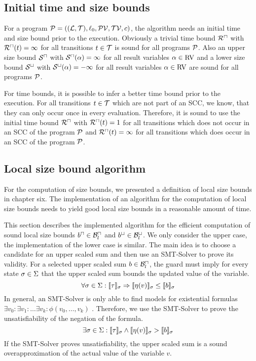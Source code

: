 \subsection{Initial time and size bounds}

For a program $\mathcal{P} = ((\mathcal{L}, \mathcal{T}), \ell_0, \mathcal{PV}, \mathcal{TV}, c)$, the algorithm needs an initial time and size bound prior to the execution.
Obviously a trivial time bound ${\mathcal{R}^\sqcap}$ with ${\mathcal{R}^\sqcap}(t) = \infty$ for all transitions $t \in \mathcal{T}$ is sound for all programs $\mathcal{P}$.
Also an upper size bound ${\mathcal{S}^\sqcap}$ with ${\mathcal{S}^\sqcap}(\alpha) = \infty$ for all result variables $\alpha \in \text{RV}$ and a lower size bound ${\mathcal{S}^\sqcup}$ with ${\mathcal{S}^\sqcup}(\alpha) = -\infty$ for all result variables $\alpha \in \text{RV}$ are sound for all programs $\mathcal{P}$.

For time bounds, it is possible to infer a better time bound prior to the execution.
For all transitions $t \in \mathcal{T}$ which are not part of an SCC, we know, that they can only occur once in every evaluation.
Therefore, it is sound to use the initial time bound ${\mathcal{R}^\sqcap}$ with ${\mathcal{R}^\sqcap}(t) = 1$ for all transitions which does not occur in an SCC of the program $\mathcal{P}$ and ${\mathcal{R}^\sqcap}(t) = \infty$ for all transitions which does occur in an SCC of the program $\mathcal{P}$.

\subsection{Local size bound algorithm}

For the computation of size bounds, we presented a definition of local size bounds in chapter six.
The implementation of an algorithm for the computation of local size bounds needs to yield good local size bounds in a reasonable amount of time.

This section describes the implemented algorithm for the efficient computation of sound local size bounds $b^\sqcap \in \mathcal{B}^\sqcap_l$ and $b^\sqcup \in \mathcal{B}^\sqcup_l$.
We only consider the upper case, the implementation of the lower case is similar.
The main idea is to choose a candidate for an upper scaled sum and then use an SMT-Solver to prove its validity.
For a selected upper scaled sum $b \in \mathcal{B}^\sqcap_l$, the guard must imply for every state $\sigma \in \Sigma$ that the upper scaled sum bounds the updated value of the variable.
\[ \forall \sigma \in \Sigma: \llbracket \tau \rrbracket_{\sigma} \Rightarrow \llbracket \eta(v) \rrbracket_{\sigma} \leq \llbracket b \rrbracket_{\sigma} \]
In general, an SMT-Solver is only able to find models for existential formulas $\exists v_0: \exists v_1: \dots \exists v_k: \phi(v_0, \dots, v_k)$ \cite{smt}.
Therefore, we use the SMT-Solver to prove the unsatisfiability of the negation of the formula.
\[ \exists \sigma \in \Sigma: \llbracket \tau \rrbracket_{\sigma} \wedge \llbracket \eta(v) \rrbracket_{\sigma} > \llbracket b \rrbracket_{\sigma} \]
If the SMT-Solver proves unsatisfiability, the upper scaled sum is a sound overapproximation of the actual value of the variable $v$.


